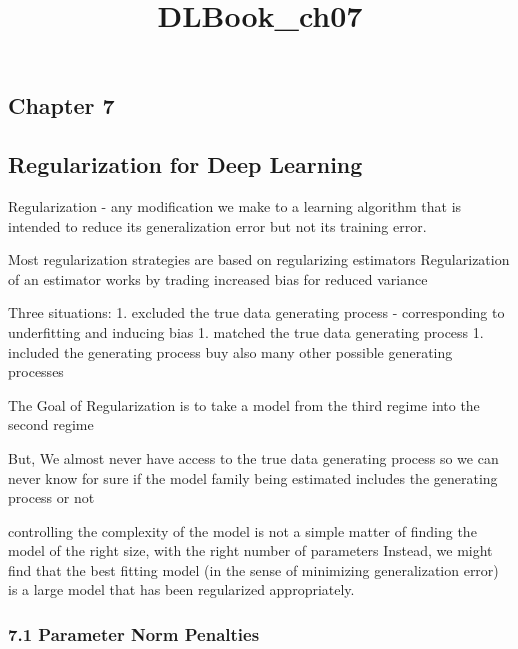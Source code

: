 \documentclass[11pt]{article}
\title{DLBook\_ch07}
\begin{document}
    
    
    \maketitle
    
    

    
    \hypertarget{chapter-7}{%
\subsection{Chapter 7}\label{chapter-7}}

    \hypertarget{regularization-for-deep-learning}{%
\subsection{Regularization for Deep
Learning}\label{regularization-for-deep-learning}}

    Regularization - any modification we make to a learning algorithm that
is intended to reduce its generalization error but not its training
error.

    Most regularization strategies are based on regularizing estimators
Regularization of an estimator works by trading increased bias for
reduced variance 

    Three situations: 1. excluded the true data generating process -
corresponding to underfitting and inducing bias 1. matched the true data
generating process 1. included the generating process buy also many
other possible generating processes

    The Goal of Regularization is to take a model from the third regime into
the second regime

    But, We almost never have access to the true data generating process so
we can never know for sure if the model family being estimated includes
the generating process or not

    controlling the complexity of the model is not a simple matter of
finding the model of the right size, with the right number of parameters
Instead, we might find that the best fitting model (in the sense of
minimizing generalization error) is a large model that has been
regularized appropriately.

    \hypertarget{parameter-norm-penalties}{%
\subsubsection{7.1 Parameter Norm
Penalties}\label{parameter-norm-penalties}}
\end{document}
